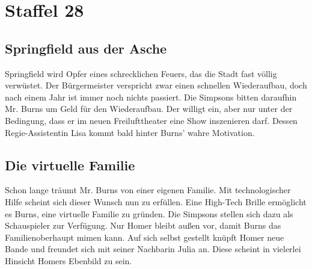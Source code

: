 
\section{Staffel 28}

\subsection{Springfield aus der Asche}
Springfield wird Opfer eines schrecklichen Feuers, das die Stadt fast völlig verwüstet. Der Bürgermeister verspricht zwar einen schnellen Wiederaufbau, doch nach einem Jahr ist immer noch nichts passiert. Die Simpsons bitten daraufhin Mr. Burns um Geld für den Wiederaufbau. Der willigt ein, aber nur unter der Bedingung, dass er im neuen Freilufttheater eine Show inszenieren darf. Dessen Regie-Assistentin Lisa kommt bald hinter Burns' wahre Motivation.


\subsection{Die virtuelle Familie}\label{VABF18}
Schon lange träumt Mr. Burns von einer eigenen Familie. Mit technologischer Hilfe scheint sich dieser Wunsch nun zu erfüllen. Eine High-Tech Brille ermöglicht es Burns, eine virtuelle Familie zu gründen. Die Simpsons stellen sich dazu als Schauspieler zur Verfügung. Nur Homer bleibt außen vor, damit Burns das Familienoberhaupt mimen kann. Auf sich selbst gestellt knüpft Homer neue Bande und freundet sich mit seiner Nachbarin Julia an. Diese scheint in vielerlei Hinsicht Homers Ebenbild zu sein.

